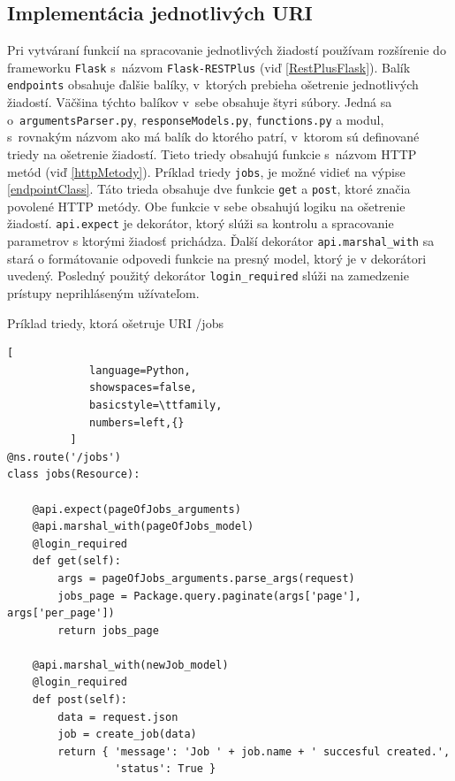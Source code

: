 \documentclass[zadani,slovak]{fitthesis}
\begin{document}
\subsection{Implementácia jednotlivých URI}
Pri vytváraní funkcií na spracovanie jednotlivých žiadostí používam rozšírenie do frameworku \texttt{Flask} s~názvom \texttt{Flask-RESTPlus} (viď \ref{RestPlusFlask}). Balík \texttt{endpoints} obsahuje ďalšie balíky, v~ktorých prebieha ošetrenie jednotlivých žiadostí. Väčšina týchto balíkov v~sebe obsahuje štyri súbory. Jedná sa o~\texttt{argumentsParser.py}, \texttt{responseModels.py}, \texttt{functions.py} a modul, s~rovnakým názvom ako má balík do ktorého patrí, v~ktorom sú definované triedy na ošetrenie žiadostí. Tieto triedy obsahujú funkcie s~názvom HTTP metód (viď \ref{httpMetody}). Príklad triedy \texttt{jobs}, je možné vidieť na výpise \ref{endpointClass}. Táto trieda obsahuje dve funkcie \texttt{get} a \texttt{post}, ktoré značia povolené HTTP metódy. Obe funkcie v sebe obsahujú logiku na ošetrenie žiadostí. \texttt{api.expect} je dekorátor, ktorý slúži sa kontrolu a spracovanie parametrov s ktorými žiadosť prichádza. Ďalší dekorátor \texttt{api.marshal\_with} sa stará o formátovanie odpovedi funkcie na presný model, ktorý je v dekorátori uvedený. Posledný použitý dekorátor \texttt{login\_required} slúži na zamedzenie prístupy neprihláseným užívateľom.
\begin{algorithm}
  \caption{Príklad triedy, ktorá ošetruje URI /jobs}
  \label{endpointClass}
  \begin{lstlisting}[
             language=Python,
             showspaces=false,
             basicstyle=\ttfamily,
             numbers=left,{}
          ]
@ns.route('/jobs')
class jobs(Resource):

    @api.expect(pageOfJobs_arguments)
    @api.marshal_with(pageOfJobs_model)
    @login_required
    def get(self):
        args = pageOfJobs_arguments.parse_args(request)
        jobs_page = Package.query.paginate(args['page'], args['per_page'])
        return jobs_page

    @api.marshal_with(newJob_model)
    @login_required
    def post(self):
        data = request.json
        job = create_job(data)
        return { 'message': 'Job ' + job.name + ' succesful created.',
                 'status': True }
  \end{lstlisting}
\end{algorithm}
\end{document}
